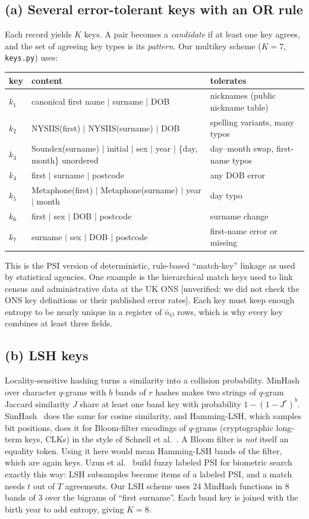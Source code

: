 \documentclass[10pt]{article}
\newcommand{\unverified}[1]{\textcolor{orange!70!black}{[unverified: #1]}}
\begin{document}
\subsection{(a) Several error-tolerant keys with an OR rule}
Each record yields $K$ keys. A pair becomes a \emph{candidate} if at least one key agrees, and the set of agreeing key types is its \emph{pattern}. Our multikey scheme ($K=7$, \texttt{keys.py}) uses:
\begin{center}\small
\begin{tabular}{@{}lll@{}}
\toprule
key & content & tolerates \\
\midrule
$k_1$ & canonical first name $|$ surname $|$ DOB & nicknames (public nickname table)\\
$k_2$ & NYSIIS(first) $|$ NYSIIS(surname) $|$ DOB & spelling variants, many typos\\
$k_3$ & Soundex(surname) $|$ initial $|$ sex $|$ year $|$ \{day, month\} unordered & day--month swap, first-name typos\\
$k_4$ & first $|$ surname $|$ postcode & any DOB error\\
$k_5$ & Metaphone(first) $|$ Metaphone(surname) $|$ year $|$ month & day typo\\
$k_6$ & first $|$ sex $|$ DOB $|$ postcode & surname change\\
$k_7$ & surname $|$ sex $|$ DOB $|$ postcode & first-name error or missing\\
\bottomrule
\end{tabular}
\end{center}
This is the PSI version of deterministic, rule-based ``match-key'' linkage as used by statistical agencies. One example is the hierarchical match keys used to link census and administrative data at the UK ONS \unverified{we did not check the ONS key definitions or their published error rates}. Each key must keep enough entropy to be nearly unique in a register of $\bar n_O$ rows, which is why every key combines at least three fields.

\subsection{(b) LSH keys}
Locality-sensitive hashing turns a similarity into a collision probability. MinHash~\cite{broder1997resemblance} over character $q$-grams with $b$ bands of $r$ hashes makes two strings of $q$-gram Jaccard similarity $J$ share at least one band key with probability $1-(1-J^r)^b$. SimHash~\cite{charikar2002similarity} does the same for cosine similarity, and Hamming-LSH, which samples bit positions, does it for Bloom-filter encodings of $q$-grams (cryptographic long-term keys, CLKs) in the style of Schnell et al.~\cite{schnell2009privacy}. A Bloom filter is \emph{not} itself an equality token. Using it here would mean Hamming-LSH bands of the filter, which are again keys. Uzun et al.~\cite{uzun2021fuzzy} build fuzzy labeled PSI for biometric search exactly this way: LSH subsamples become items of a labeled PSI, and a match needs $t$ out of $T$ agreements. Our LSH scheme uses 24 MinHash functions in 8 bands of 3 over the bigrams of ``first surname''. Each band key is joined with the birth year to add entropy, giving $K=8$.
\end{document}
